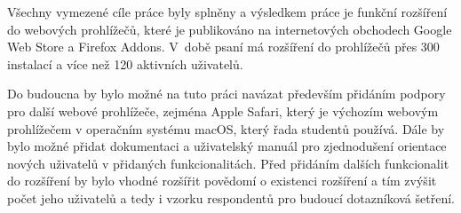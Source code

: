 Všechny vymezené cíle práce byly splněny a výsledkem práce je funkční rozšíření do webových prohlížečů, které je publikováno na internetových obchodech Google Web Store a Firefox Addons. V~době psaní má rozšíření do prohlížečů přes 300 instalací a více než 120 aktivních uživatelů. 

\clearpage
Do budoucna by bylo možné na tuto práci navázat především přidáním podpory pro další webové prohlížeče, zejména Apple Safari, který je výchozím webovým prohlížečem v operačním systému macOS, který řada studentů používá. Dále by bylo možné přidat dokumentaci a uživatelský manuál pro zjednodušení orientace nových uživatelů v přidaných funkcionalitách. Před přidáním dalších funkcionalit do rozšíření by bylo vhodné rozšířit povědomí o existenci rozšíření a tím zvýšit počet jeho uživatelů a tedy i vzorku respondentů pro budoucí dotazníková šetření. 
